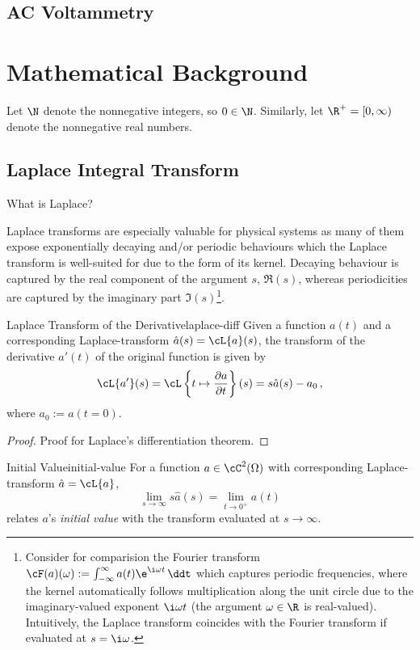 \documentclass{prettytex/ox/mmsc-special-topic}
\begin{document}
  \subsection{AC Voltammetry}

  \section{Mathematical Background}
  Let $\N$ denote the nonnegative integers, so $0 \in \N$.
  Similarly, let $\R^+ = [0, \infty)$ denote the nonnegative real numbers.

  \subsection{Laplace Integral Transform}
  What is Laplace?

  Laplace transforms are especially valuable for physical systems as many of them expose exponentially decaying and/or periodic behaviours which the Laplace transform is well-suited for due to the form of its kernel.
  Decaying behaviour is captured by the real component of the argument $s$, $\Re(s)$, whereas periodicities are captured by the imaginary part $\Im(s)$\footnote{Consider for comparision the Fourier transform $\cF(a)(\omega) := \int_{-\infty}^{\infty} a(t) \e^{\i \omega t} \,\ddt$ which captures periodic frequencies, where the kernel automatically follows multiplication along the unit circle due to the imaginary-valued exponent $\i\omega t$ (the argument $\omega \in \R$ is real-valued). Intuitively, the Laplace transform coincides with the Fourier transform if evaluated at $s = \i \omega$.}.

  \begin{theorem}{Laplace Transform of the Derivative}{laplace-diff}
    Given a function $a(t)$ and a corresponding Laplace-transform $\hat{a}(s) = \cL\{a\}(s)$, the transform of the derivative $a'(t)$ of the original function is given by
    $$\cL\{a'\}(s) = \cL\left\{t \mapsto \frac{\partial a}{\partial t}\right\}(s) = s\hat{a}(s) - a_0\,,$$
    where $a_0 := a(t=0)$.
  \end{theorem}

  \begin{proof}
    Proof for Laplace's differentiation theorem.
  \end{proof}

  \begin{theorem}{Initial Value}{initial-value}
    For a function $a \in \cC^2(\Omega)$ with corresponding Laplace-transform $\hat{a} = \cL\{a\}$,
    $$\lim_{s \rightarrow \infty} s \hat{a}(s) = \lim_{t \rightarrow 0^+} a(t)$$
    relates $a$'s \textit{initial value} with the transform evaluated at $s \rightarrow \infty$.
  \end{theorem}
\end{document}
